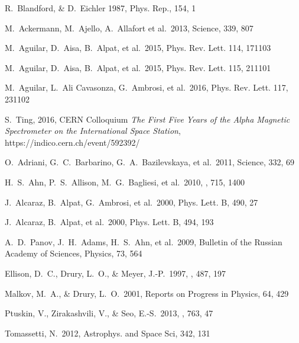 \documentclass[twocolumn,showpacs,amsmath,amssymb]{revtex4-1}
\begin{document}
\begin{thebibliography}{99}

R.~Blandford, \& D.~Eichler 1987, Phys. Rep., 154, 1 
  
M.~Ackermann, M.~Ajello, A.~Allafort et al.\ 2013, Science, 339, 807   
  
M.~Aguilar, D.~Aisa, B.~Alpat, et al.\ 2015, Phys. Rev. Lett. 114, 171103   

M.~Aguilar, D.~Aisa, B.~Alpat, et al.\ 2015, Phys. Rev. Lett. 115, 211101 

M.~Aguilar, L.~Ali Cavasonza, G.~Ambrosi, et al.\ 2016, Phys. Rev. Lett. 117, 231102 

S.~Ting, 2016, CERN Colloquium {\it The First Five Years of the Alpha Magnetic Spectrometer on the International Space Station}, https://indico.cern.ch/event/592392/
  
O.~Adriani, G.~C.~Barbarino, G.~A.~Bazilevskaya, et al.\ 2011, Science, 332, 69  
  
H.~S.~Ahn, P.~S.~Allison, M.~G.~Bagliesi, et al.\ 2010, \apj, 715, 1400   

J.~Alcaraz, B.~Alpat, G.~Ambrosi, et al.\ 2000, Phys. Lett. B, 490, 27 

J.~Alcaraz, B.~Alpat, et al.\ 2000, Phys. Lett. B, 494, 193 

A.~D.~Panov, J.~H.~Adams, H.~S.~Ahn, et al.\ 2009, Bulletin of the Russian Academy of Sciences, Physics, 73, 564

Ellison, D.~C., Drury, L.~O., \& Meyer, J.-P.\ 1997, \apj, 487, 197 

Malkov, M.~A., \& Drury, L.~O.\ 2001, Reports on Progress in Physics, 64, 429 

Ptuskin, V., Zirakashvili, V., \& Seo, E.-S.\ 2013, \apj, 763, 47 

Tomassetti, N.\ 2012, Astrophys. and Space Sci, 342, 131
  

\end{thebibliography}
\end{document}
